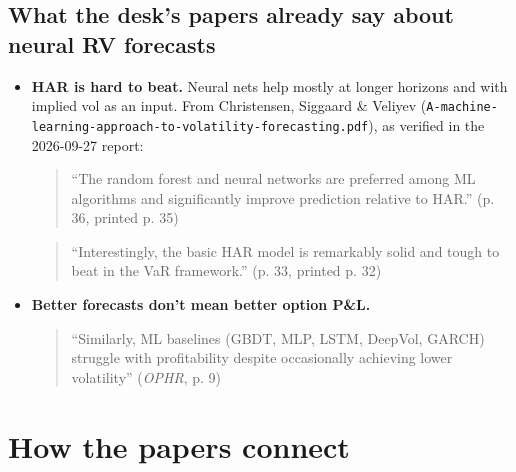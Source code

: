 \documentclass{article}
\begin{document}
\subsection{What the desk's papers already say about neural RV forecasts}

\begin{itemize}

\item \textbf{HAR is hard to beat.} Neural nets help mostly at longer horizons and with implied vol as an input. From Christensen, Siggaard \& Veliyev (\texttt{A-\allowbreak{}machine-\allowbreak{}learning-\allowbreak{}approach-\allowbreak{}to-\allowbreak{}volatility-\allowbreak{}forecasting.\allowbreak{}pdf}), as verified in the 2026-09-27 report:

\begin{quote}``The random forest and neural networks are preferred among ML algorithms and significantly improve prediction relative to HAR.'' (p. 36, printed p. 35)\end{quote}

\begin{quote}``Interestingly, the basic HAR model is remarkably solid and tough to beat in the VaR framework.'' (p. 33, printed p. 32)\end{quote}

\item \textbf{Better forecasts don't mean better option P\&L.}

\begin{quote}``Similarly, ML baselines (GBDT, MLP, LSTM, DeepVol, GARCH) struggle with profitability despite occasionally achieving lower volatility'' (\emph{OPHR}, p. 9)\end{quote}

\end{itemize}

\section{How the papers connect}
\end{document}
